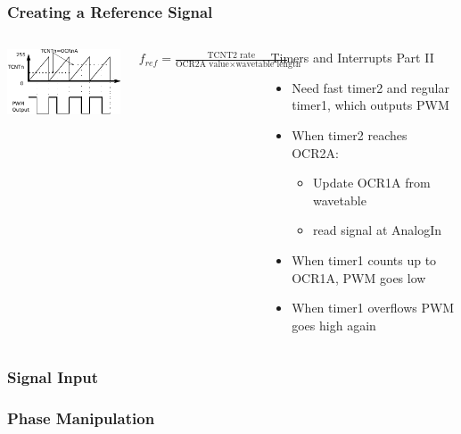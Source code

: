 \documentclass{beamer}
\begin{document}
\begin{frame}
\frametitle{Creating a Reference Signal}
\begin{columns}[T]
	\vspace{.5cm}
	    \includegraphics[scale=1.2]{Bitbang}
	    \vspace{1cm}
	    \begin{exampleblock}
	    $f_{ref}=\frac{\text{TCNT2 rate}}{\text{OCR2A value}\times\text{wavetable length}}$
	    \end{exampleblock}

	\begin{exampleblock}{Timers and Interrupts Part II}
	\begin{itemize}
	\item {Need fast timer2 and regular timer1, which outputs PWM}
	\item{When timer2 reaches OCR2A:}
	\begin{itemize}
        \item {Update OCR1A from wavetable}
        \item{ read signal at AnalogIn}
	\end{itemize}
	\item{When timer1 counts up to OCR1A, PWM goes low}
	\item {When timer1 overflows PWM goes high again}
	
	\end{itemize}
	
	\end{exampleblock}
\end{columns}
\end{frame}

\begin{frame}
\frametitle{Signal Input}

\end{frame}
\begin{frame}
\frametitle{Phase Manipulation}

\end{frame}
\end{document}
